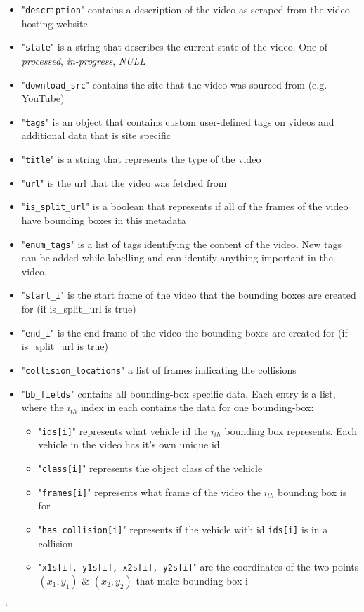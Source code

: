 \documentclass[letterpaper, 10 pt, conference]{IEEEconf}
\begin{document}
\begin{itemize}
  \item "\texttt{description}" contains a description of the video as scraped from the video hosting website
  \item "\texttt{state}" is a string that describes the current state of the video. One of \textit{processed}, \textit{in-progress}, \textit{NULL}
  \item "\texttt{download\_src}" contains the site that the video was sourced from (e.g. YouTube)
  \item "\texttt{tags}" is an object that contains custom user-defined tags on videos and additional data that is site specific
  \item "\texttt{title}" is a string that represents the type of the video
  \item "\texttt{url}" is the url that the video was fetched from
  \item "\texttt{is\_split\_url}" is a boolean that represents if all of the frames of the video have bounding boxes in this metadata
  \item "\texttt{enum\_tags}" is a list of tags identifying the content of the video. New tags can be added while labelling and can identify anything important in the video.
  \item "\texttt{start\_i}" is the start frame of the video that the bounding boxes are created for (if is\_split\_url is true)
  \item "\texttt{end\_i}" is the end frame of the video the bounding boxes are created for (if is\_split\_url is true)
  \item "\texttt{collision\_locations}" a list of frames indicating the collisions
  \item "\texttt{bb\_fields}" contains all bounding-box specific data. Each entry is a list, where the $i_{th}$ index in each contains the data for one bounding-box:
  \begin{itemize}
    \item "\texttt{ids[i]}" represents what vehicle id the $i_{th}$ bounding box represents. Each vehicle in the video has it's own unique id
    \item "\texttt{class[i]}" represents the object class of the vehicle
    \item "\texttt{frames[i]}" represents what frame of the video the $i_{th}$ bounding box is for
    \item "\texttt{has\_collision[i]}" represents if the vehicle with id \texttt{ids[i]} is in a collision
    \item "\texttt{x1s[i], y1s[i], x2s[i], y2s[i]}" are the coordinates of the two points $(x_1,y_1)$ \& $(x_2,y_2)$ that make bounding box i
  \end{itemize}
\end{itemize}`
\end{document}
